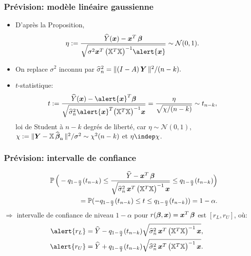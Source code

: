 \begin{frame}
\frametitle{Prévision: modèle linéaire gaussienne}
\begin{itemize}
\item D'après la Proposition,
$$
\eta:=\frac{\widehat{Y}(\bx) - \bx^T\truebeta}{\sqrt{\sigma^2 {\bx^T\big(\regressmat^T\regressmat\big)^{-1}\alert{\bx}}}}
\sim {\mathcal N}(0,1).
$$
\item On replace $\sigma^2$ inconnu par $\widehat \sigma_n^2 =
{\|(I-A) \operatorname{\boldsymbol{Y}} \|^2}/({n-k}).$
\item \alert{$t$-statistique:}
$$
t:= \frac{\widehat{Y}(\bx) -\alert{\bx}^T\truebeta}{\sqrt{\widehat
\sigma_n^2 \alert{\bx}^T\big(\regressmat^T\regressmat\big)^{-1}{
\bx}}}=\frac{\eta}{\sqrt{\chi/(n-k)}}\sim t_{n-k},
$$
\alert{loi de Student à $n-k$ degrés de liberté}, car $\eta\sim
{\mathcal N}(0,1)$, $\chi:=\|\boldsymbol{Y}-\mathbb{X}
\operatorname{\widehat{\boldsymbol{\beta}}_n}\|^2/\sigma^2\sim \chi^2(n-k)$ et $\eta \indep \chi$.
\end{itemize}
\end{frame}

\begin{frame}
\frametitle{Prévision: intervalle de confiance}
\begin{eqnarray*}
&&\operatorname{{\mathbb P}} \Big(-q_{1-\frac{\alpha}{2}}(t_{n-k}) \le \frac{\widehat Y
- \operatorname{\boldsymbol{x}}^T\boldsymbol{\beta}} {\sqrt{\widehat \sigma_n^2  \operatorname{\boldsymbol{x}}^T\big(\mathbb{X}^T\mathbb{X}\big)^{-1} \operatorname{\boldsymbol{x}} }}\le
q_{1-\frac{\alpha}{2}}(t_{n-k})\Big) \\\hspace{4mm} &&= \operatorname{{\mathbb P}}(-
q_{1-\frac{\alpha}{2}}(t_{n-k}) \le t\le
q_{1-\frac{\alpha}{2}}(t_{n-k})) = 1-\alpha.
\end{eqnarray*}
$\Longrightarrow$ \alert{intervalle de confiance} de niveau
$1-\alpha$ pour $r(\boldsymbol{\beta},\operatorname{\boldsymbol{x}})=\operatorname{\boldsymbol{x}}^T\boldsymbol{\beta}$ est
\alert{$[r_L, r_U]$}, o\`u:
\begin{align*}
\alert{r_L}&=\widehat Y -
q_{1-\frac{\alpha}{2}}(t_{n-k})\sqrt{\widehat \sigma_n^2
\bx^T\big(\regressmat^T\regressmat\big)^{-1}\bx},\\
\alert{r_U}&= \widehat Y +
q_{1-\frac{\alpha}{2}}(t_{n-k})\sqrt{\widehat \sigma_n^2 \bx^T\big(\regressmat^T\regressmat\big)^{-1} \bx}.
\end{align*}
\end{frame}



